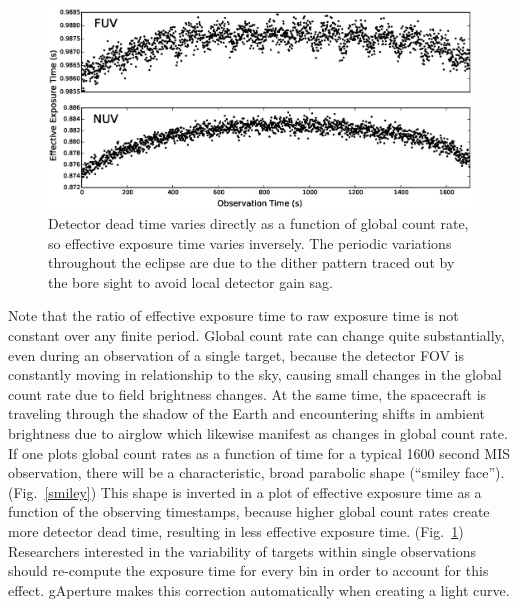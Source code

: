 \documentclass[5p]{elsarticle}
\begin{document}
\begin{figure}
\includegraphics[scale=0.31]{expt_frowny.eps}
\caption{Detector dead time varies directly as a function of global count rate, so effective exposure time varies inversely. The periodic variations throughout the eclipse are due to the dither pattern traced out by the bore sight to avoid local detector gain sag.\label{frowny}}
\end{figure}


Note that the ratio of effective exposure time to raw exposure time is not constant over any finite period. Global count rate can change quite substantially, even during an observation of a single target, because the detector FOV is constantly moving in relationship to the sky, causing small changes in the global count rate due to field brightness changes. At the same time, the spacecraft is traveling through the shadow of the Earth and encountering shifts in ambient brightness due to airglow which likewise manifest as changes in global count rate. If one plots global count rates as a function of time for a typical 1600 second MIS observation, there will be a characteristic, broad parabolic shape (``smiley face''). (Fig.\ \ref{smiley}) This shape is inverted in a plot of effective exposure time as a function of the observing timestamps, because higher global count rates create more detector dead time, resulting in less effective exposure time. (Fig.\ \ref{frowny}) Researchers interested in the variability of targets within single observations should re-compute the exposure time for every bin in order to account for this effect. gAperture makes this correction automatically when creating a light curve.
\end{document}
